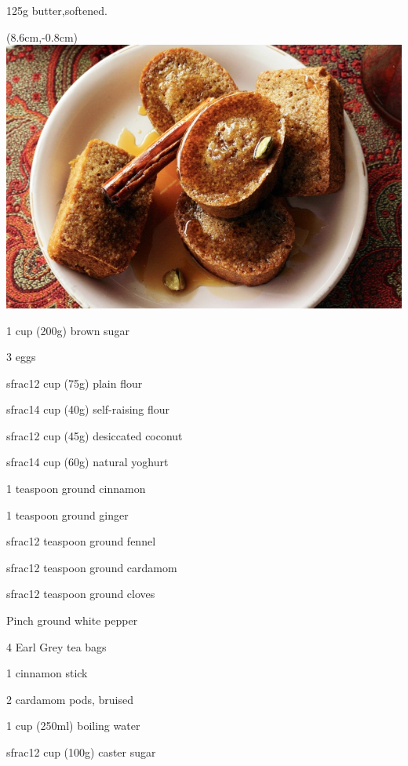 \begin{ingredients-list}
	\item 125g butter,softened.
		\begin{textblock*}{8cm}(8.6cm,-0.8cm) %
			\includegraphics[scale=0.35]{./img/chai-spiced_cakes.jpg}
		\end{textblock*}
	\item 1 cup (200g) brown sugar
	\item 3 eggs
	\item sfrac{1}{2} cup (75g) plain flour
	\item sfrac{1}{4} cup (40g) self-raising flour
	\item sfrac{1}{2} cup (45g) desiccated coconut
	\item sfrac{1}{4} cup (60g) natural yoghurt
	\item 1 teaspoon ground cinnamon
	\item 1 teaspoon ground ginger
	\item sfrac{1}{2} teaspoon ground fennel
	\item sfrac{1}{2} teaspoon ground cardamom
	\item sfrac{1}{2} teaspoon ground cloves
	\item Pinch ground white pepper
	\item 4 Earl Grey tea bags
	\item 1 cinnamon stick
	\item 2 cardamom pods, bruised
	\item 1 cup (250ml) boiling water
	\item sfrac{1}{2} cup (100g) caster sugar 
\end{ingredients-list}

